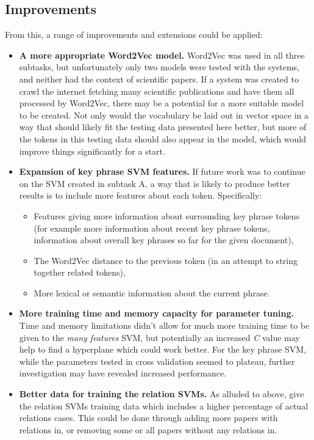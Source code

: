 \subsection{Improvements}
From this, a range of improvements and extensions could be applied:
\begin{itemize}
	\item \textbf{A more appropriate Word2Vec model.} Word2Vec was used in all three subtasks, but unfortunately only two models were tested with the systems, and neither had the context of scientific papers. If a system was created to crawl the internet fetching many scientific publications and have them all processed by Word2Vec, there may be a potential for a more suitable model to be created. Not only would the vocabulary be laid out in vector space in a way that should likely fit the testing data presented here better, but more of the tokens in this testing data should also appear in the model, which would improve things significantly for a start. 
	\item \textbf{Expansion of key phrase SVM features.} If future work was to continue on the SVM created in subtask A, a way that is likely to produce better results is to include more features about each token. Specifically:
	\begin{itemize}
		\item Features giving more information about surrounding key phrase tokens (for example more information about recent key phrase tokens, information about overall key phrases so far for the given document),
		\item The Word2Vec distance to the previous token (in an attempt to string together related tokens),
		\item More lexical or semantic information about the current phrase.
	\end{itemize}
	\item \textbf{More training time and memory capacity for parameter tuning.} Time and memory limitations didn't allow for much more training time to be given to the \textit{many features} SVM, but potentially an increased \textit{C} value may help to find a hyperplane which could work better. For the key phrase SVM, while the parameters tested in cross validation seemed to plateau, further investigation may have revealed increased performance.
	\item \textbf{Better data for training the relation SVMs.} As alluded to above, give the relation SVMs training data which includes a higher percentage of actual relations cases. This could be done through adding more papers with relations in, or removing some or all papers without any relations in.
\end{itemize}
